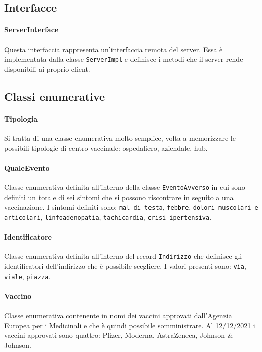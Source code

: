 	
\subsection{Interfacce}
	
	\paragraph{ServerInterface}
	Questa interfaccia rappresenta un'interfaccia remota del server.
	Essa è implementata dalla classe \verb|ServerImpl| e definisce i metodi che il server rende disponibili ai proprio client.
		

\subsection{Classi enumerative}
	
	\paragraph{Tipologia}
	Si tratta di una classe enumerativa molto semplice, volta a memorizzare le possibili tipologie di centro vaccinale: ospedaliero, aziendale, hub.
	
	\paragraph{QualeEvento}
	Classe enumerativa definita all'interno della classe \verb|EventoAvverso| in cui sono definiti un totale di sei sintomi che si possono riscontrare in seguito a una vaccinazione.
	I sintomi definiti sono: \verb|mal di testa|, \verb|febbre|, \verb|dolori muscolari e articolari|, \verb|linfoadenopatia|, \verb|tachicardia|, \verb|crisi ipertensiva|.
	
	\paragraph{Identificatore}
	Classe enumerativa definita all'interno del record \verb|Indirizzo| che definisce gli identificatori dell'indirizzo che è possibile scegliere.
	I valori presenti sono: \verb|via|, \verb|viale|, \verb|piazza|.
	
	\paragraph{Vaccino}
	Classe enumerativa contenente in nomi dei vaccini approvati dall’Agenzia Europea per i Medicinali e che è quindi possibile somministrare.
	Al 12/12/2021 i vaccini approvati sono quattro: Pfizer, Moderna, AstraZeneca, Johnson \& Johnson.
	